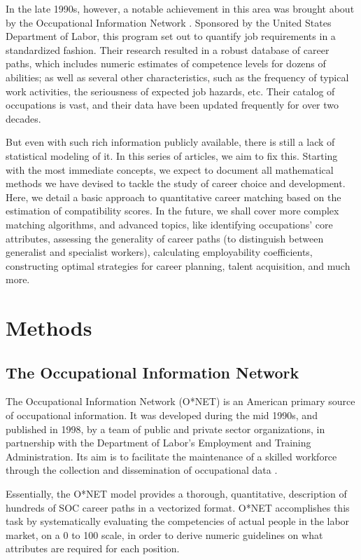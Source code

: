 \documentclass{article}
\begin{document}
In the late 1990s, however, a notable achievement in this area was brought
about by the Occupational Information Network \parencite{onet1998data}.
Sponsored by the United States Department of Labor, this program set out to
quantify job requirements in a standardized fashion. Their research resulted in
a robust database of career paths, which includes numeric estimates of
competence levels for dozens of abilities; as well as several other
characteristics, such as the frequency of typical work activities, the
seriousness of expected job hazards, etc. Their catalog of occupations is vast,
and their data have been updated frequently for over two decades.

But even with such rich information publicly available, there is still a lack
of statistical modeling of it. In this series of articles, we aim to fix this.
Starting with the most immediate concepts, we expect to document all
mathematical methods we have devised to tackle the study of career choice and
development. Here, we detail a basic approach to quantitative career matching
based on the estimation of compatibility scores. In the future, we shall cover
more complex matching algorithms, and advanced topics, like identifying
occupations' core attributes, assessing the generality of career paths (to
distinguish between generalist and specialist workers), calculating
employability coefficients, constructing optimal strategies for career
planning, talent acquisition, and much more.

\section{Methods}
\subsection{The Occupational Information Network}
The Occupational Information Network (O*NET) is an American primary source of
occupational information. It was developed during the mid 1990s, and published
in 1998, by a team of public and private sector organizations, in partnership
with the Department of Labor's Employment and Training Administration. Its aim
is to facilitate the maintenance of a skilled workforce through the collection
and dissemination of occupational data
\parencites{mariani1999onet}{onet2024about}.

Essentially, the O*NET model provides a thorough, quantitative, description of
hundreds of SOC \parencite[Standard Occupational Classification,
    see][]{bls2018soc} career paths in a vectorized format. O*NET accomplishes this
task by systematically evaluating the competencies of actual people in the
labor market, on a 0 to 100 scale, in order to derive numeric guidelines on
what attributes are required for each position.
\end{document}
